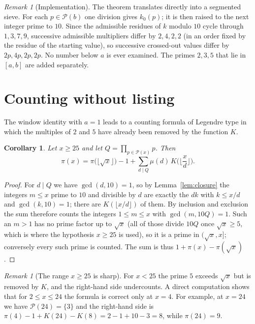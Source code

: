 \documentclass[11pt]{amsart}
\newtheorem{corollary}[theorem]{Corollary}
\theoremstyle{definition}
\theoremstyle{remark}
\newtheorem{remark}[theorem]{Remark}
\newcommand{\Sv}{\mathcal{P}}
\begin{document}
\begin{remark}[Implementation]\label{rem:steps}
The theorem translates directly into a segmented sieve. For each $p\in\Sv(b)$ one division gives $k_0(p)$; it is then raised to the next integer prime to $10$. Since the admissible residues of $k$ modulo $10$ cycle through $1,3,7,9$, successive admissible multipliers differ by $2,4,2,2$ (in an order fixed by the residue of the starting value), so successive crossed-out values differ by $2p,4p,2p,2p$. No number below $a$ is ever examined. The primes $2,3,5$ that lie in $[a,b]$ are added separately.
\end{remark}

\section{Counting without listing}\label{sec:count}

The window identity with $a=1$ leads to a counting formula of Legendre type in which the multiples of $2$ and $5$ have already been removed by the function $K$.

\begin{corollary}\label{cor:legendre}
Let $x\ge 25$ and let $Q=\prod_{p\in\Sv(x)}p$. Then
\[
\pi(x)=\pi\big(\lfloor\sqrt x\rfloor\big)-1+\sum_{d\mid Q}\mu(d)\,K\Big(\Big\lfloor\frac{x}{d}\Big\rfloor\Big).
\]
\end{corollary}

\begin{proof}
For $d\mid Q$ we have $\gcd(d,10)=1$, so by Lemma~\ref{lem:closure} the integers $m\le x$ prime to $10$ and divisible by $d$ are exactly the $dk$ with $k\le x/d$ and $\gcd(k,10)=1$; there are $K(\lfloor x/d\rfloor)$ of them. By inclusion and exclusion the sum therefore counts the integers $1\le m\le x$ with $\gcd(m,10Q)=1$. Such an $m>1$ has no prime factor up to $\sqrt x$ (all of those divide $10Q$ once $\sqrt x\ge 5$, which is where the hypothesis $x\ge 25$ is used), so it is a prime in $(\sqrt x,x]$; conversely every such prime is counted. The sum is thus $1+\pi(x)-\pi(\sqrt x)$.
\end{proof}

\begin{remark}[The range $x\ge 25$ is sharp]\label{rem:sharp}
For $x<25$ the prime $5$ exceeds $\sqrt x$ but is removed by $K$, and the right-hand side undercounts. A direct computation shows that for $2\le x\le 24$ the formula is correct only at $x=4$. For example, at $x=24$ we have $\Sv(24)=\{3\}$ and the right-hand side is $\pi(4)-1+K(24)-K(8)=2-1+10-3=8$, while $\pi(24)=9$.
\end{remark}
\end{document}
